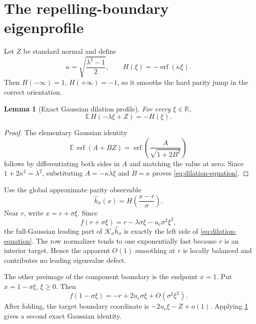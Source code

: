 \documentclass[11pt]{article}
\newtheorem{lemma}[theorem]{Lemma}
\theoremstyle{definition}
\theoremstyle{remark}
\newcommand{\R}{\mathbb R}
\newcommand{\uc}{u_{\mathrm c}}
\newcommand{\cK}{\mathcal K}
\newcommand{\erfop}{\operatorname{erf}}
\begin{document}
\section{The repelling-boundary eigenprofile}
\label{sec:left-layer}

Let $Z$ be standard normal and define
\begin{equation}\label{eq:kappa-H}
 \kappa=\sqrt{\frac{\lambda^2-1}{2}},
 \qquad
 H(\xi)=-\erfop(\kappa\xi).
\end{equation}
Then $H(-\infty)=1$, $H(+\infty)=-1$, so it smooths the hard parity jump in
the correct orientation.

\begin{lemma}[Exact Gaussian dilation profile]
\label{lem:exact-profile}
For every $\xi\in\R$,
\begin{equation}\label{eq:dilation-equation}
 \mathbb E\,H(-\lambda\xi+Z)=-H(\xi).
\end{equation}
\end{lemma}

\begin{proof}
The elementary Gaussian identity
\begin{equation}\label{eq:erf-identity}
 \mathbb E\,\erfop(A+BZ)
 =\erfop\!\left(\frac{A}{\sqrt{1+2B^2}}\right)
\end{equation}
follows by differentiating both sides in $A$ and matching the value at zero.
Since $1+2\kappa^2=\lambda^2$, substituting
$A=-\kappa\lambda\xi$ and $B=\kappa$ proves
\eqref{eq:dilation-equation}.
\end{proof}

Use the global approximate parity observable
\begin{equation}\label{eq:h-sigma}
 \widehat h_\sigma(x)=H\!\left(\frac{x-r}{\sigma}\right).
\end{equation}
Near $r$, write $x=r+\sigma\xi$.  Since
\begin{equation}\label{eq:f-at-r}
 f(r+\sigma\xi)=r-\lambda\sigma\xi-\uc\sigma^2\xi^2,
\end{equation}
the full-Gaussian leading part of
$\cK_\sigma\widehat h_\sigma$ is exactly the left side of
\eqref{eq:dilation-equation}.  The row normalizer tends to one exponentially
fast because $r$ is an interior target.  Hence the apparent $O(1)$ smoothing
at $r$ is locally balanced and contributes no leading eigenvalue defect.

The other preimage of the component boundary is the endpoint $x=1$.  Put
$x=1-\sigma\xi$, $\xi\ge0$.  Then
\begin{equation}\label{eq:f-at-one}
 f(1-\sigma\xi)
 =-r+2\uc\sigma\xi+O(\sigma^2\xi^2).
\end{equation}
After folding, the target boundary coordinate is
$-2\uc\xi-Z+o(1)$.  Applying \cref{lem:exact-profile} gives a second exact
Gaussian identity.
\end{document}
